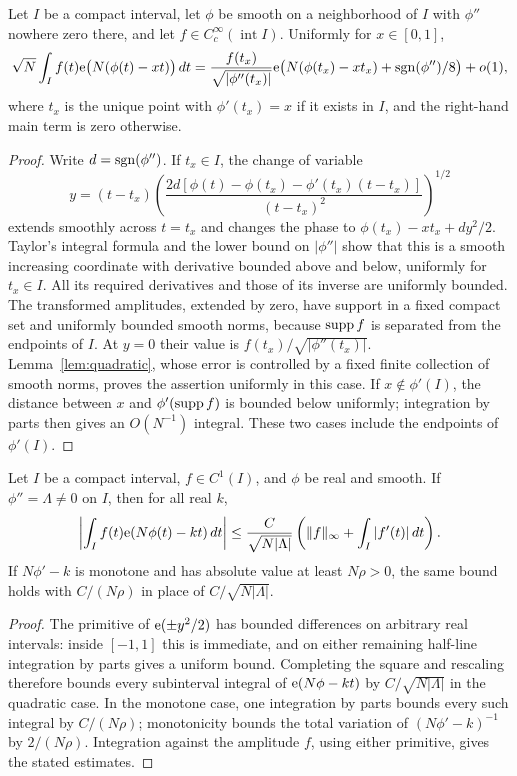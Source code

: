 \begin{lemma}\label{lem:stationary-phase}
Let $I$ be a compact interval, let $\phi$ be smooth on a neighborhood
of $I$ with $\phi''$ nowhere zero there, and let
$f\in C_c^\infty(\operatorname{int}I)$. Uniformly for $x\in[0,1]$,
\begin{equation}\label{eq:stationary-phase}
 \sqrt N\int_I f(t)\mathrm e\bigl(N(\phi(t)-xt)\bigr)\,dt
 =\frac{f(t_x)}{\sqrt{|\phi''(t_x)|}}
   \mathrm e\bigl(N(\phi(t_x)-xt_x)+\operatorname{sgn}(\phi'')/8\bigr)+o(1),
\end{equation}
where $t_x$ is the unique point with $\phi'(t_x)=x$ if it exists in
$I$, and the right-hand main term is zero otherwise.
\end{lemma}
\begin{proof}
Write $d=\operatorname{sgn}(\phi'')$. If $t_x\in I$, the change of variable
\[
 y=(t-t_x)
 \left(\frac{2d[\phi(t)-\phi(t_x)-\phi'(t_x)(t-t_x)]}
 {(t-t_x)^2}\right)^{1/2}
\]
extends smoothly across $t=t_x$ and changes the phase to
$\phi(t_x)-xt_x+dy^2/2$. Taylor's integral formula and the lower
bound on $|\phi''|$ show that this is a smooth increasing coordinate
with derivative bounded above and below, uniformly for $t_x\in I$.
All its required derivatives and those of its inverse are uniformly
bounded. The transformed amplitudes, extended by zero, have support
in a fixed compact set and uniformly bounded smooth norms, because
$\operatorname{supp} f$ is separated from the endpoints of $I$. At $y=0$ their
value is $f(t_x)/\sqrt{|\phi''(t_x)|}$.
Lemma~\ref{lem:quadratic}, whose error is controlled by a fixed finite
collection of smooth norms, proves the assertion uniformly in this
case. If $x\notin\phi'(I)$, the distance between $x$ and
$\phi'(\operatorname{supp} f)$ is bounded below uniformly; integration by parts
then gives an $O(N^{-1})$ integral. These two cases include the
endpoints of $\phi'(I)$.
\end{proof}

\begin{lemma}\label{lem:oscillatory-bounds}
Let $I$ be a compact interval, $f\in C^1(I)$, and $\phi$ be real and smooth.
If $\phi''=\Lambda\ne0$ on $I$, then for all real $k$,
\begin{equation}\label{eq:quadratic-bound}
 \left|\int_I f(t)\mathrm e(N\phi(t)-kt)\,dt\right|
 \le\frac{C}{\sqrt{N|\Lambda|}}
       \left(\lVert f\rVert_\infty+\int_I|f'(t)|\,dt\right).
\end{equation}
If $N\phi'-k$ is monotone and has absolute value at least $N\rho>0$,
the same bound holds with $C/(N\rho)$ in place of
$C/\sqrt{N|\Lambda|}$.
\end{lemma}
\begin{proof}
The primitive of $\mathrm e(\pm y^2/2)$ has bounded differences on arbitrary
real intervals: inside $[-1,1]$ this is immediate, and on either
remaining half-line integration by parts gives a uniform bound.
Completing the square and rescaling therefore bounds every subinterval
integral of $\mathrm e(N\phi-kt)$ by $C/\sqrt{N|\Lambda|}$ in the quadratic
case. In the monotone case, one integration by parts bounds every such
integral by $C/(N\rho)$; monotonicity bounds the total variation of
$(N\phi'-k)^{-1}$ by $2/(N\rho)$. Integration against the amplitude
$f$, using either primitive, gives the stated estimates.
\end{proof}
